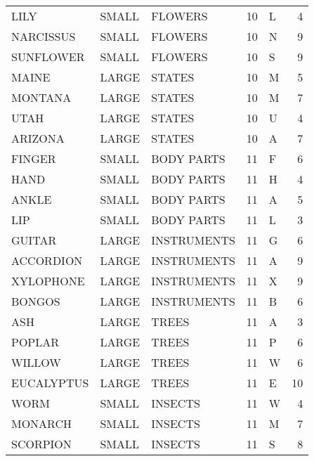 \begin{tabular}{lllrlr}
        LILY & SMALL &          FLOWERS &       10 &            L &       4 \\
   NARCISSUS & SMALL &          FLOWERS &       10 &            N &       9 \\
   SUNFLOWER & SMALL &          FLOWERS &       10 &            S &       9 \\
       MAINE & LARGE &           STATES &       10 &            M &       5 \\
     MONTANA & LARGE &           STATES &       10 &            M &       7 \\
        UTAH & LARGE &           STATES &       10 &            U &       4 \\
     ARIZONA & LARGE &           STATES &       10 &            A &       7 \\
      FINGER & SMALL &       BODY PARTS &       11 &            F &       6 \\
        HAND & SMALL &       BODY PARTS &       11 &            H &       4 \\
       ANKLE & SMALL &       BODY PARTS &       11 &            A &       5 \\
         LIP & SMALL &       BODY PARTS &       11 &            L &       3 \\
      GUITAR & LARGE &      INSTRUMENTS &       11 &            G &       6 \\
   ACCORDION & LARGE &      INSTRUMENTS &       11 &            A &       9 \\
   XYLOPHONE & LARGE &      INSTRUMENTS &       11 &            X &       9 \\
      BONGOS & LARGE &      INSTRUMENTS &       11 &            B &       6 \\
         ASH & LARGE &            TREES &       11 &            A &       3 \\
      POPLAR & LARGE &            TREES &       11 &            P &       6 \\
      WILLOW & LARGE &            TREES &       11 &            W &       6 \\
  EUCALYPTUS & LARGE &            TREES &       11 &            E &      10 \\
        WORM & SMALL &          INSECTS &       11 &            W &       4 \\
     MONARCH & SMALL &          INSECTS &       11 &            M &       7 \\
    SCORPION & SMALL &          INSECTS &       11 &            S &       8 \\

\end{tabular}
